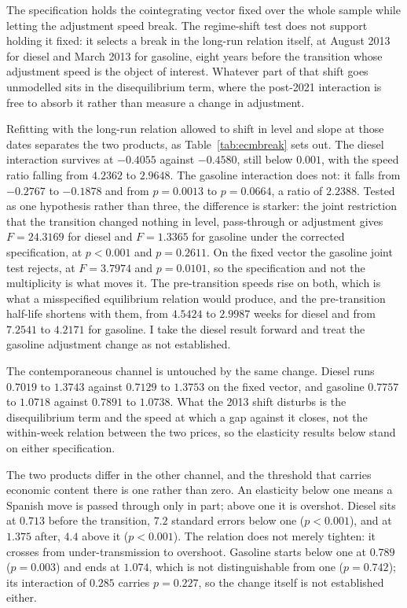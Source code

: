 \documentclass[11pt,a4paper]{article}
\begin{document}
The specification holds the cointegrating vector fixed over the whole sample while letting the
adjustment speed break. The regime-shift test does not support holding it fixed: it selects a
break in the long-run relation itself, at August 2013 for diesel and March 2013 for gasoline,
eight years before the transition whose adjustment speed is the object of interest. Whatever
part of that shift goes unmodelled sits in the disequilibrium term, where the post-2021
interaction is free to absorb it rather than measure a change in adjustment.

Refitting with the long-run relation allowed to shift in level and slope at those dates
separates the two products, as Table~\ref{tab:ecmbreak} sets out. The diesel interaction survives at $-0.4055$ against $-0.4580$,
still below $0.001$, with the speed ratio falling from $4.2362$ to $2.9648$. The gasoline
interaction does not: it falls from $-0.2767$ to $-0.1878$ and from $p=0.0013$ to $p=0.0664$,
a ratio of $2.2388$. Tested as one hypothesis rather than three, the difference is starker:
the joint restriction that the transition changed nothing in level, pass-through or adjustment
gives $F=24.3169$ for diesel and $F=1.3365$ for gasoline under the corrected specification, at
$p<0.001$ and $p=0.2611$. On the fixed vector the gasoline joint test rejects, at $F=3.7974$
and $p=0.0101$, so the specification and not the multiplicity is what moves it. The
pre-transition speeds rise on both, which is what a misspecified
equilibrium relation would produce, and the pre-transition half-life shortens with them, from
$4.5424$ to $2.9987$ weeks for diesel and from $7.2541$ to $4.2171$ for gasoline. I take the
diesel result forward and treat the gasoline adjustment change as not established.

The contemporaneous channel is untouched by the same change. Diesel runs $0.7019$ to $1.3743$
against $0.7129$ to $1.3753$ on the fixed vector, and gasoline $0.7757$ to $1.0718$ against
$0.7891$ to $1.0738$. What the 2013 shift disturbs is the disequilibrium term and the speed at
which a gap against it closes, not the within-week relation between the two prices, so the
elasticity results below stand on either specification.


The two products differ in the other channel, and the threshold that carries economic content
there is one rather than zero. An elasticity below one means a Spanish move is passed through
only in part; above one it is overshot. Diesel sits at $0.713$ before the transition, $7.2$
standard errors below one ($p<0.001$), and at $1.375$ after, $4.4$ above it ($p<0.001$). The
relation does not merely tighten: it crosses from under-transmission to overshoot. Gasoline
starts below one at $0.789$ ($p=0.003$) and ends at $1.074$, which is not distinguishable from
one ($p=0.742$); its interaction of $0.285$ carries $p=0.227$, so the change itself is not
established either.
\end{document}
